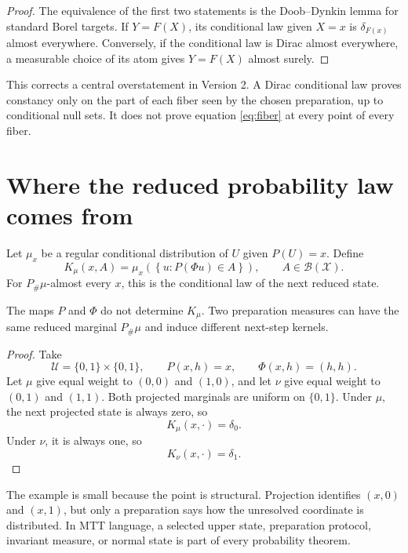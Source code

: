 \documentclass[11pt]{article}
\newcommand{\Uu}{\mathcal U}
\newcommand{\Xx}{\mathcal X}
\newcommand{\Borel}{\mathcal B}
\begin{document}
\begin{proof}
The equivalence of the first two statements is the Doob--Dynkin lemma for
standard Borel targets. If \(Y=F(X)\), its conditional law given \(X=x\) is
\(\delta_{F(x)}\) almost everywhere. Conversely, if the conditional law is
Dirac almost everywhere, a measurable choice of its atom gives
\(Y=F(X)\) almost surely.
\end{proof}

This corrects a central overstatement in Version 2. A Dirac conditional law
proves constancy only on the part of each fiber seen by the chosen
preparation, up to conditional null sets. It does not prove equation
\eqref{eq:fiber} at every point of every fiber.

\section{Where the reduced probability law comes from}

Let \(\mu_x\) be a regular conditional distribution of \(U\) given
\(P(U)=x\). Define
\begin{equation}
K_\mu(x,A)
=
\mu_x\!\left(
\left\{u:P(\Phi u)\in A\right\}
\right),
\qquad A\in\Borel(\Xx).
\label{eq:kernel}
\end{equation}
For \(P_\#\mu\)-almost every \(x\), this is the conditional law of the next
reduced state.

\begin{proposition}
\label{prop:preparation}
The maps \(P\) and \(\Phi\) do not determine \(K_\mu\). Two preparation
measures can have the same reduced marginal \(P_\#\mu\) and induce different
next-step kernels.
\end{proposition}

\begin{proof}
Take
\[
\Uu=\{0,1\}\times\{0,1\},
\qquad
P(x,h)=x,
\qquad
\Phi(x,h)=(h,h).
\]
Let \(\mu\) give equal weight to \((0,0)\) and \((1,0)\), and let \(\nu\)
give equal weight to \((0,1)\) and \((1,1)\). Both projected marginals are
uniform on \(\{0,1\}\). Under \(\mu\), the next projected state is always
zero, so
\[
K_\mu(x,\cdot)=\delta_0.
\]
Under \(\nu\), it is always one, so
\[
K_\nu(x,\cdot)=\delta_1.
\]
\end{proof}

The example is small because the point is structural. Projection identifies
\((x,0)\) and \((x,1)\), but only a preparation says how the unresolved
coordinate is distributed. In MTT language, a selected upper state,
preparation protocol, invariant measure, or normal state is part of every
probability theorem.
\end{document}
